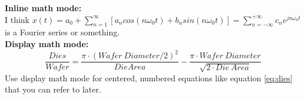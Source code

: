 \documentclass{article}
\begin{document}
\noindent \textbf{Inline math mode:}\\
I think $x(t)=a_0 + \sum\limits_{n=1}^{\infty}[a_n cos(n\omega_0 t) + b_n sin(n\omega_0 t)] = \sum\limits_{n=-\infty}^{+\infty}c_n e^{jn\omega_0t}$ is a Fourier series or something.\\

\noindent \textbf{Display math mode:}\\
\begin{equation}
\label{eq:dies}
\dfrac{Dies}{Wafer} = \dfrac {\pi \cdot (Wafer\ Diameter/2)^2}{Die Area} - \dfrac {\pi \cdot Wafer\ Diameter} {\sqrt{2 \cdot Die\ Area}}
\end{equation}
Use display math mode for centered, numbered equations like equation \ref{eq:dies} that you can refer to later. 
\end{document}
